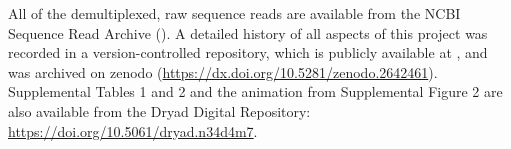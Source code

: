 All of the demultiplexed, raw sequence reads are available from the NCBI
Sequence Read Archive
().
A detailed history of all aspects of this project was recorded in a
version-controlled repository, which is publicly available at
,
and was archived on zenodo
(\url{https://dx.doi.org/10.5281/zenodo.2642461}).
Supplemental Tables 1 and 2 and the animation from Supplemental Figure 2 are
also available from the Dryad Digital Repository:
\url{https://doi.org/10.5061/dryad.n34d4m7}.
